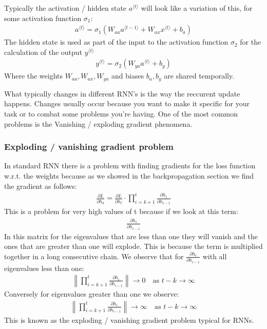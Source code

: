 \documentclass[a4paper,12pt]{article}
\begin{document}
Typically the activation / hidden state $a^{\langle t \rangle}$ will look like a variation of this, for some activation function $\sigma_1$:
\begin{align}
  a^{\langle t \rangle} = \sigma_1\left(W_{aa} a^{\langle t-1 \rangle} + W_{ax} x^{\langle t \rangle} + b_a\right)
\end{align}
The hidden state is used as part of the input to the activation function $\sigma_2$ for the calculation of the output $y^{\langle t \rangle}$
\begin{align}
  y^{\langle t \rangle} = \sigma_2\left(W_{ya} a^{\langle t \rangle} + b_y\right)
\end{align}
Where the weights $W_{aa}, W_{ax}, W_{ya}$ and biases $b_a, b_y$ are shared temporally.

What typically changes in different RNN's is the way the reccurent update happens. Changes usually occur because you want to make it specific for your task or to combat some problems you're having. One of the most common problems is the Vanishing / exploding gradient phenomena.
\subsubsection{Exploding / vanishing gradient problem}
In standard RNN there is a problem with finding gradients for the loss function w.r.t. the weights because as we showed in the backpropagation section we find the gradient as follows:
\begin{align}
  \frac{\partial L}{\partial h_k} = \frac{\partial L}{\partial h_t} \cdot \prod_{i=k+1}^{t} \frac{\partial h_i}{\partial h_{i-1}}
\end{align}
This is a problem for very high values of t because if we look at this term:
\begin{align}
  \frac{\partial h_i}{\partial h_{i-1}}
\end{align}
In this matrix for the eigenvalues that are less than one they will vanish and the ones that are greater than one will explode. This is because the term is multiplied together in a long consecutive chain.
We observe that for $\frac{\partial h_i}{\partial h_{i-1}}$ with all eigenvalues less than one:
\begin{align}
  \left\| \prod_{i=k+1}^{t} \frac{\partial h_i}{\partial h_{i-1}} \right\| \to 0 \quad \text{as } t - k \to \infty
\end{align}
Conversely for eigenvalues greater than one we observe:
\begin{align}
  \left\| \prod_{i=k+1}^{t} \frac{\partial h_i}{\partial h_{i-1}} \right\| \to \infty \quad \text{as } t - k \to \infty
\end{align}
This is known as the exploding / vanishing gradient problem typical for RNNs.
\end{document}
